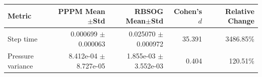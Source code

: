 \begin{tabular}{lrrrr}
\toprule
Metric & PPPM Mean$\pm$Std & RBSOG Mean$\pm$Std & Cohen's $d$ & Relative Change \\
\midrule
Step time & 0.000699 $\pm$ 0.000063 & 0.025070 $\pm$ 0.000972 & 35.391 & 3486.85\% \\
Pressure variance & 8.412e-04 $\pm$ 8.727e-05 & 1.855e-03 $\pm$ 3.552e-03 & 0.404 & 120.51\% \\
\bottomrule
\end{tabular}
